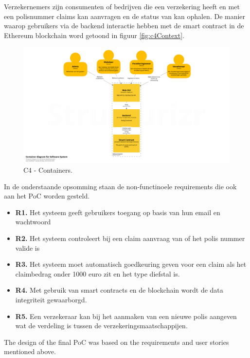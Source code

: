 Verzekernemers zijn consumenten of bedrijven die een verzekering heeft en met een polisnummer claims kan aanvragen en de status van kan ophalen. De manier waarop gebruikers via de backend interactie hebben met de smart contract in de Ethereum blockchain word getoond in figuur \ref{fig:c4Context}.

\begin{figure}[h!]
    \begin{center}
        \includegraphics[width=\paperwidth-100]{images/containers}
        \caption{C4 - Containers.}
        \label{fig:c4Containers}
    \end{center}
\end{figure}

In de onderstaande opsomming staan de non-functinoele requirements die ook aan het PoC worden gesteld.
\begin{itemize}
  \item \textbf{R1.} Het systeem geeft gebruikers toegang op basis van hun email en wachtwoord
  \item \textbf{R2.} Het systeem controleert bij een claim aanvraag van of het polis nummer valide is
  \item \textbf{R3.} Het systeem moet automatisch goedkeuring geven voor een claim als het claimbedrag onder 1000 euro zit en het type diefstal is.
  \item \textbf{R4.} Met gebruik van smart contracts en de blockchain wordt de data integriteit gewaarborgd.
  \item \textbf{R5.} Een verzekeraar kan bij het aanmaken van een nieuwe polis aangeven wat de verdeling is tussen de verzekeringsmaatschappijen.
\end{itemize}

The design of the final PoC was based on the requirements and user stories mentioned above.